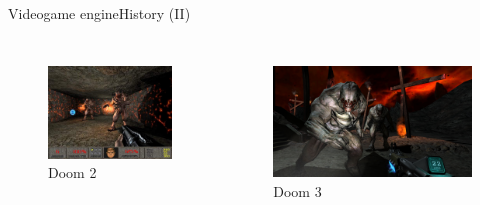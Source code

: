 \documentclass[10pt,compress]{beamer} %
\begin{document}
\begin{frame}{Videogame engine}{History (II)}
\begin{columns}
\begin{figure}[t]
\begin{center}
		    \includegraphics[width=\linewidth]{figs/doom2}\\
			Doom 2
			\bigskip
		\end{center}
   	 	\end{figure}
   	 	\begin{figure}[t]
		\begin{center}
		    \includegraphics[width=\linewidth]{figs/doom3}\\
			Doom 3
			\bigskip
		\end{center}
   	 	\end{figure}
	\end{columns}
\end{frame}
\end{document}
